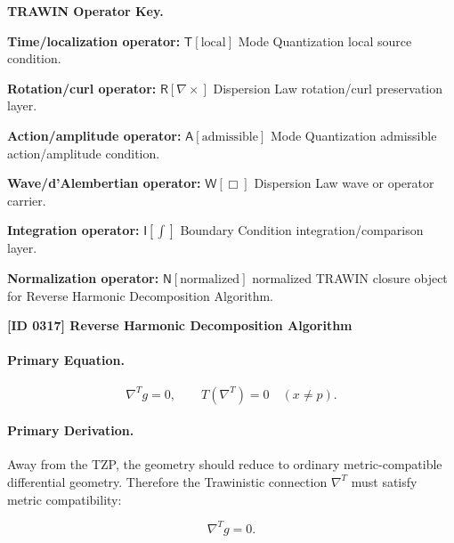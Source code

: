 \par\vspace{0.45\baselineskip}
\noindent\begin{minipage}[t]{\linewidth}
\begingroup
\small
\raggedright
\textbf{TRAWIN Operator Key.}\par
\noindent\textbf{Time/localization operator:} $\mathsf{T}\!\left[\mathrm{local}\right]$ Mode Quantization local source condition.\par
\noindent\textbf{Rotation/curl operator:} $\mathsf{R}\!\left[\nabla\times\right]$ Dispersion Law rotation/curl preservation layer.\par
\noindent\textbf{Action/amplitude operator:} $\mathsf{A}\!\left[\mathrm{admissible}\right]$ Mode Quantization admissible action/amplitude condition.\par
\noindent\textbf{Wave/d'Alembertian operator:} $\mathsf{W}\!\left[\Box\right]$ Dispersion Law wave or operator carrier.\par
\noindent\textbf{Integration operator:} $\mathsf{I}\!\left[\int\right]$ Boundary Condition integration/comparison layer.\par
\noindent\textbf{Normalization operator:} $\mathsf{N}\!\left[\mathrm{normalized}\right]$ normalized TRAWIN closure object for Reverse Harmonic Decomposition Algorithm.\par
\endgroup
\end{minipage}

\clearpage
\noindent\textbf{[ID 0317] Reverse Harmonic Decomposition Algorithm}\par
\vspace{0.35em}
\paragraph{Primary Equation.}
\begin{equation}
\nabla^{T}g=0,
\qquad
T(\nabla^{T})=0
\quad
(x\neq p).
\end{equation}

\paragraph{Primary Derivation.}
Away from the TZP, the geometry should reduce to ordinary metric-compatible differential geometry. Therefore the Trawinistic connection $\nabla^{T}$ must satisfy metric compatibility:

\begin{equation}
\nabla^{T}g=0 .
\end{equation}


